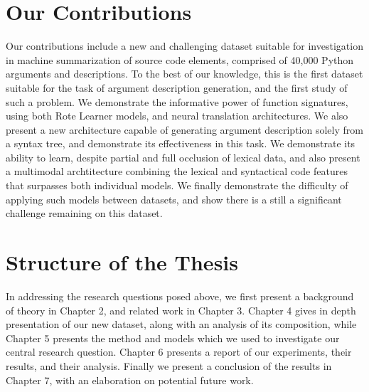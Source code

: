 \section{Our Contributions}

Our contributions include a new and challenging dataset suitable for investigation in machine summarization of source code elements, comprised of 40,000 Python arguments and descriptions.
To the best of our knowledge, this is the first dataset suitable for the task of argument description generation, and the first study of such a problem.
We demonstrate the informative power of function signatures, using both Rote Learner models, and neural translation architectures.
We also present a new architecture capable of generating argument description solely from a syntax tree, and demonstrate its effectiveness in this task.
We demonstrate its ability to learn, despite partial and full occlusion of lexical data, and also present a multimodal archtitecture combining the lexical and syntactical code features that surpasses both individual models.
We finally demonstrate the difficulty of applying such models between datasets, and show there is a still a significant challenge remaining on this dataset.


\section{Structure of the Thesis} %
\label{sec:structure_of_the_thesis}

In addressing the research questions posed above, we first present a background of theory in Chapter 2, and related work in Chapter 3.
Chapter 4 gives in depth presentation of our new dataset, along with an analysis of its composition, while Chapter 5 presents the method and models which we used to investigate our central research question. 
Chapter 6 presents a report of our experiments, their results, and their analysis.
Finally we present a conclusion of the results in Chapter 7, with an elaboration on potential future work.









